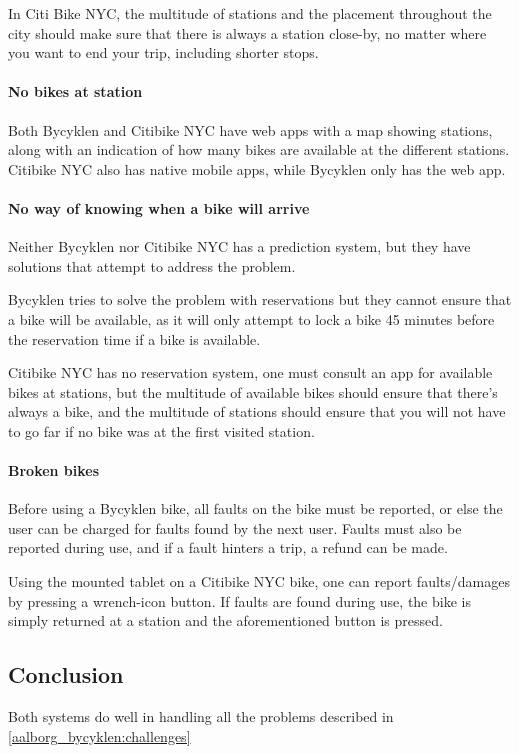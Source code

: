 In Citi Bike NYC, the multitude of stations and the placement throughout the city should make sure that there is always a station close-by, no matter where you want to end your trip, including shorter stops.

\paragraph{No bikes at station}
Both Bycyklen and Citibike NYC have web apps with a map showing stations, along with an indication of how many bikes are available at the different stations.
Citibike NYC also has native mobile apps, while Bycyklen only has the web app.

\paragraph{No way of knowing when a bike will arrive}
Neither Bycyklen nor Citibike NYC has a prediction system, but they have solutions that attempt to address the problem.

Bycyklen tries to solve the problem with reservations but they cannot ensure that a bike will be available, as it will only attempt to lock a bike 45 minutes before the reservation time if a bike is available.

Citibike NYC has no reservation system, one must consult an app for available bikes at stations, but the multitude of  available bikes should ensure that there's always a bike, and the multitude of stations should ensure that you will not have to go far if no bike was at the first visited station.

\paragraph{Broken bikes}
Before using a Bycyklen bike, all faults on the bike must be reported, or else the user can be charged for faults found by the next user.
Faults must also be reported during use, and if a fault hinters a trip, a refund can be made.

Using the mounted tablet on a Citibike NYC bike, one can report faults/damages by pressing a wrench-icon button.
If faults are found during use, the bike is simply returned at a station and the aforementioned button is pressed.

\subsection{Conclusion}
Both systems do well in handling all the problems described in \cref{aalborg_bycyklen:challenges}

